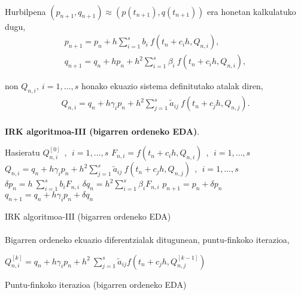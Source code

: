 \paragraph*{}Hurbilpena $(p_{n+1},q_{n+1}) \approx (p(t_{n+1}),q(t_{n+1}))$ era honetan kalkulatuko dugu,
\begin{align*}
p_{n+1}=p_n+ h \sum\limits_{i=1}^{s} b_i \ f(t_n+c_ih,Q_{n,i}),\\
q_{n+1}=q_n+ h p_{n} + h^2 \sum\limits_{i=1}^{s} \beta_i \ f(t_n+c_ih,Q_{n,i}),
\end{align*}

non $Q_{n,i}, \ i=1,\dots,s$ honako ekuazio sistema definitutako atalak diren, 
\begin{align*}
Q_{n,i}=q_n+ h\gamma_i p_n+ h^2 \sum\limits_{j=1}^{s} \tilde{a}_{ij} \ f(t_n+c_jh,Q_{n,j}).
\end{align*}

\paragraph*{}{\textbf{IRK algoritmoa-III (bigarren ordeneko EDA)}.}


\begin{algorithm}[H]
 \BlankLine
  {
   \BlankLine
   Hasieratu  $Q_{n,i}^{[0]} \ \ , \ \ i=1,\dots,s $\;
    \BlankLine
   {
    \BlankLine 
    $F_{n,i}=f(t_n+c_ih,Q_{n,i}) \ \ , \ \  i=1,\dots,s$\;
    $Q_{n,i}=q_n+ h\gamma_i p_n+ h^2 \sum\limits_{j=1}^{s} \tilde{a}_{ij} \ f(t_n+c_jh,Q_{n,j}) \ \ , \ \  i=1,\dots,s$\;  
   }
   \BlankLine
    $\delta p_n=h \ \sum\limits_{i=1}^{s} b_i F_{n,i}$\;
    $\delta q_n=h^2 \sum\limits_{i=1}^{s} \beta_i F_{n,i}$\;    
    $p_{n+1}=p_{n}+ \delta p_n $\;
    $q_{n+1}=q_{n}+ h\gamma_i p_n+\delta q_n $\;
   \BlankLine
 }
 \caption{IRK algoritmoa-III (bigarren ordeneko EDA)}\label{alg:IRK2}
\end{algorithm}

\paragraph*{}Bigarren ordeneko ekuazio diferentzialak ditugunean, puntu-finkoko iterazioa,

\begin{algorithm}[H]
  {
   $Q_{n,i}^{[k]}=q_{n}+h \gamma_i p_{n}+ h^2 \ \sum\limits_{j=1}^{s} \tilde{a}_{ij} f(t_n+c_jh,Q_{n,j}^{[k-1]}) $\;  
  }
 \caption{Puntu-finkoko iterazioa (bigarren ordeneko EDA)}
\end{algorithm} 


